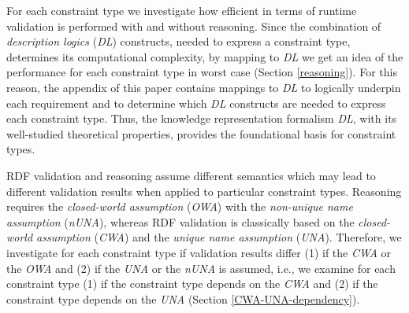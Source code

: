 \documentclass{acm_proc_article-sp}
\newcommand{\ms}[1]{%
  \texttt{#1}
}
\begin{document}
For each constraint type we investigate how efficient in terms of runtime validation is performed with and without reasoning.
Since the combination of \emph{description logics} (\emph{DL}) constructs, needed to express a constraint type, determines its computational complexity, 
by mapping to \emph{DL} we get an idea of the performance for each constraint type in worst case (Section \ref{reasoning}).
For this reason, the appendix of this paper contains mappings to \emph{DL} to logically underpin each requirement and to determine which \emph{DL} constructs are needed to express each constraint type.
Thus, the knowledge representation formalism \emph{DL}, with its well-studied theoretical properties, 
provides the foundational basis for constraint types. 

RDF validation and reasoning assume different semantics which may lead to different validation results when applied to particular constraint types. %
Reasoning requires the {\em closed-world assumption} (\emph{OWA}) with the {\em non-unique name assumption} (\emph{nUNA}), 
whereas RDF validation is classically based on the {\em closed-world assumption} (\emph{CWA}) and the {\em unique name assumption} (\emph{UNA}).
Therefore, we investigate for each constraint type if validation results differ (1) if the \emph{CWA} or the \emph{OWA} and (2) if the \emph{UNA} or the \emph{nUNA}
is assumed, i.e., we examine for each constraint type (1) if the constraint type depends on the \emph{CWA} and (2) if the constraint type depends on the \emph{UNA} (Section \ref{CWA-UNA-dependency}).
\end{document}
